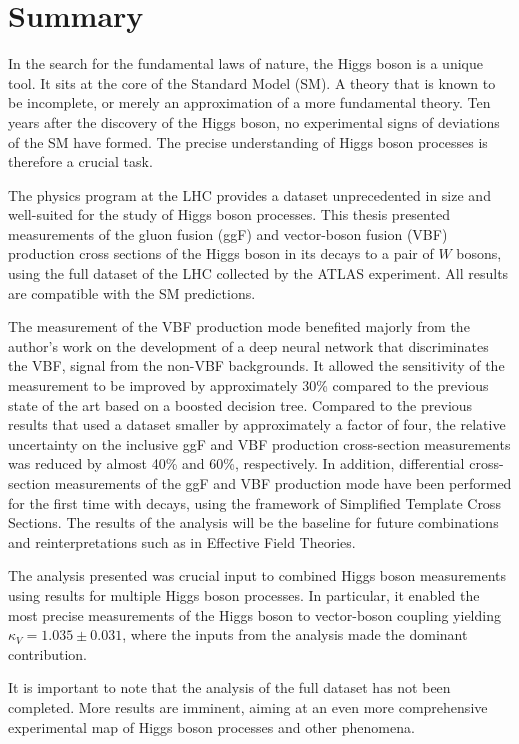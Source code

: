 \chapter{Summary}
\label{chap:summary}
In the search for the fundamental laws of nature, the Higgs boson is a unique tool. 
It sits at the core of the Standard Model (SM). A theory that is known to be incomplete, or merely an approximation of a more fundamental theory. 
Ten years after the discovery of the Higgs boson, no experimental signs of deviations of the SM have formed. 
The precise understanding of Higgs boson processes is therefore a crucial task. 

The physics program at the LHC provides a dataset unprecedented in size and well-suited for the study of Higgs boson processes. 
This thesis presented measurements of the gluon fusion (ggF) and vector-boson fusion (VBF) production cross sections of the Higgs boson in its decays to a pair of $W$ bosons, using the full \RunTwo dataset of the LHC collected by the ATLAS experiment. 
All results are compatible with the SM predictions. 

The measurement of the VBF production mode benefited majorly from the author's work on the development of a deep neural network that discriminates the VBF, \HWWdet signal from the non-VBF backgrounds. 
It allowed the sensitivity of the measurement to be improved by approximately 30\% compared to the previous state of the art based on a boosted decision tree. 
Compared to the previous \RunTwo results that used a dataset smaller by approximately a factor of four, the relative uncertainty on the inclusive ggF and VBF production cross-section measurements was reduced by almost 40\% and 60\%, respectively. 
In addition, differential cross-section measurements of the ggF and VBF production mode have been performed for the first time with \HWW decays, using the framework of Simplified Template Cross Sections. 
The results of the \HWW analysis will be the baseline for future combinations and reinterpretations such as in Effective Field Theories. 

The analysis presented was crucial input to combined Higgs boson measurements using results for multiple Higgs boson processes. 
In particular, it enabled the most precise measurements of the Higgs boson to vector-boson coupling yielding $\kappa_V = 1.035 \pm 0.031$, where the inputs from the \HWWdet analysis made the dominant contribution. 


It is important to note that the analysis of the full \RunTwo dataset has not been completed. 
More results are imminent, aiming at an even more comprehensive experimental map of Higgs boson processes and other phenomena. 


